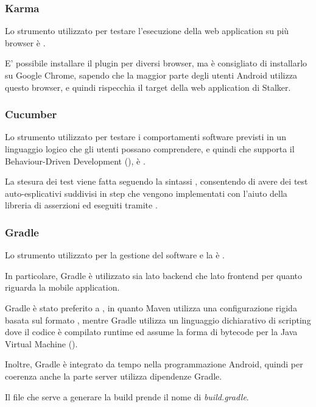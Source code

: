 \documentclass[../../../manuale-sviluppatore.tex]{subfiles}
\begin{document}


\subsubsection{Karma}%
\label{subs:karma}

Lo strumento utilizzato per testare l'esecuzione della web application su più browser è .

E' possibile installare il plugin per diversi browser, ma è consigliato di installarlo su Google Chrome, sapendo che la maggior parte degli utenti Android utilizza questo browser, e quindi rispecchia il target della web application di Stalker.

\subsubsection{Cucumber}%
\label{subs:cucumber}

Lo strumento utilizzato per testare i comportamenti software previsti in un linguaggio logico che gli utenti possano comprendere, e quindi che supporta il Behaviour-Driven Development (), è .

La stesura dei test viene fatta seguendo la sintassi , consentendo di avere dei test auto-esplicativi suddivisi in step che vengono implementati con l’aiuto della libreria di asserzioni  ed eseguiti tramite .

\subsubsection{Gradle}%
\label{subs:gradle}

Lo strumento utilizzato per la gestione del software e la  è . 

In particolare, Gradle è utilizzato sia lato backend che lato frontend per quanto riguarda la mobile application.

Gradle è stato preferito a , in quanto Maven utilizza una configurazione rigida basata sul formato , mentre Gradle utilizza un linguaggio dichiarativo di scripting  dove il codice è compilato runtime ed assume la forma di bytecode per la Java Virtual Machine ().

Inoltre, Gradle è integrato da tempo nella programmazione Android, quindi per coerenza anche la parte server utilizza dipendenze Gradle. 

Il file che serve a generare la build prende il nome di \textit{build.gradle}. 
\end{document}
